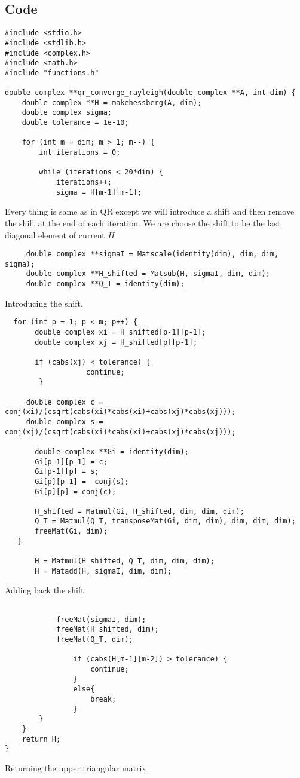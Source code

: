 \documentclass[a4paper,12pt]{article}
\theoremstyle{remark}
\begin{document}
\subsection{Code}
\begin{verbatim}
#include <stdio.h>
#include <stdlib.h>
#include <complex.h>
#include <math.h>
#include "functions.h"

double complex **qr_converge_rayleigh(double complex **A, int dim) {
    double complex **H = makehessberg(A, dim);
    double complex sigma;
    double tolerance = 1e-10;

    for (int m = dim; m > 1; m--) {
        int iterations = 0;

        while (iterations < 20*dim) {
            iterations++;
            sigma = H[m-1][m-1];
\end{verbatim}
Every thing is same as in QR except we will introduce a shift and then remove the shift at the end of each iteration. We are choose the shift to be the last diagonal element of current $\overline{H}$
\begin{verbatim}
     double complex **sigmaI = Matscale(identity(dim), dim, dim, sigma);
     double complex **H_shifted = Matsub(H, sigmaI, dim, dim);
     double complex **Q_T = identity(dim);
\end{verbatim}
Introducing the shift.
\begin{verbatim}
  for (int p = 1; p < m; p++) {
       double complex xi = H_shifted[p-1][p-1];
       double complex xj = H_shifted[p][p-1];

       if (cabs(xj) < tolerance) {
                   continue;
        }
                
     double complex c = conj(xi)/(csqrt(cabs(xi)*cabs(xi)+cabs(xj)*cabs(xj)));
     double complex s = conj(xj)/(csqrt(cabs(xi)*cabs(xi)+cabs(xj)*cabs(xj)));
       	
       double complex **Gi = identity(dim);
       Gi[p-1][p-1] = c;
       Gi[p-1][p] = s;
       Gi[p][p-1] = -conj(s);
       Gi[p][p] = conj(c);
           
       H_shifted = Matmul(Gi, H_shifted, dim, dim, dim);
       Q_T = Matmul(Q_T, transposeMat(Gi, dim, dim), dim, dim, dim);
       freeMat(Gi, dim);
   }

       H = Matmul(H_shifted, Q_T, dim, dim, dim);
       H = Matadd(H, sigmaI, dim, dim);
\end{verbatim}
Adding back the shift
\begin{verbatim}

            freeMat(sigmaI, dim);
            freeMat(H_shifted, dim);
            freeMat(Q_T, dim);

                if (cabs(H[m-1][m-2]) > tolerance) {
                    continue;
                }
                else{
                	break;
                }
        }
    }
    return H;
}
\end{verbatim}
Returning the upper triangular matrix
\end{document}
